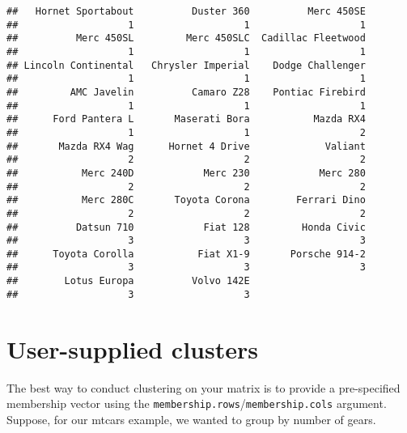 \documentclass[]{book}
\newenvironment{Shaded}{\begin{snugshade}}{\end{snugshade}}
\newcommand{\KeywordTok}[1]{\textcolor[rgb]{0.13,0.29,0.53}{\textbf{{#1}}}}
\newcommand{\DataTypeTok}[1]{\textcolor[rgb]{0.13,0.29,0.53}{{#1}}}
\newcommand{\DecValTok}[1]{\textcolor[rgb]{0.00,0.00,0.81}{{#1}}}
\newcommand{\FloatTok}[1]{\textcolor[rgb]{0.00,0.00,0.81}{{#1}}}
\newcommand{\StringTok}[1]{\textcolor[rgb]{0.31,0.60,0.02}{{#1}}}
\newcommand{\CommentTok}[1]{\textcolor[rgb]{0.56,0.35,0.01}{\textit{{#1}}}}
\newcommand{\OtherTok}[1]{\textcolor[rgb]{0.56,0.35,0.01}{{#1}}}
\newcommand{\NormalTok}[1]{{#1}}
\theoremstyle{definition}
\theoremstyle{definition}
\theoremstyle{remark}
\begin{document}
\begin{verbatim}
##   Hornet Sportabout          Duster 360          Merc 450SE 
##                   1                   1                   1 
##          Merc 450SL         Merc 450SLC  Cadillac Fleetwood 
##                   1                   1                   1 
## Lincoln Continental   Chrysler Imperial    Dodge Challenger 
##                   1                   1                   1 
##         AMC Javelin          Camaro Z28    Pontiac Firebird 
##                   1                   1                   1 
##      Ford Pantera L       Maserati Bora           Mazda RX4 
##                   1                   1                   2 
##       Mazda RX4 Wag      Hornet 4 Drive             Valiant 
##                   2                   2                   2 
##           Merc 240D            Merc 230            Merc 280 
##                   2                   2                   2 
##           Merc 280C       Toyota Corona        Ferrari Dino 
##                   2                   2                   2 
##          Datsun 710            Fiat 128         Honda Civic 
##                   3                   3                   3 
##      Toyota Corolla           Fiat X1-9       Porsche 914-2 
##                   3                   3                   3 
##        Lotus Europa          Volvo 142E 
##                   3                   3
\end{verbatim}

\hypertarget{membership-vector}{\section{User-supplied
clusters}\label{membership-vector}}

The best way to conduct clustering on your matrix is to provide a
pre-specified membership vector using the
\texttt{membership.rows}/\texttt{membership.cols} argument. Suppose, for
our mtcars example, we wanted to group by number of gears.

\begin{Shaded}
\end{Shaded}
\end{document}
